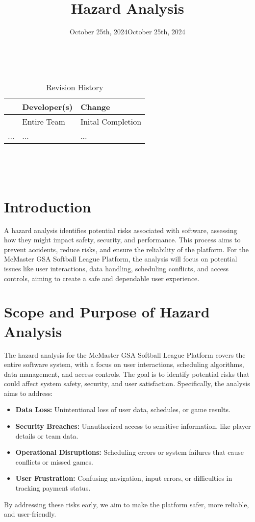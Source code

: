 \documentclass{article}
\title{Hazard Analysis\\\progname}
\author{\authname}
\date{October 25th, 2024}
\begin{document}
\maketitle
\thispagestyle{empty}

~\newpage


\begin{table}[hp]
\caption{Revision History} \label{TblRevisionHistory}
\begin{tabularx}{\textwidth}{llX}
\toprule
\textbf{} & \textbf{Developer(s)} & \textbf{Change}\\
\midrule
\date{October 25th, 2024} & Entire Team & Inital Completion\\
... & ... & ...\\
\bottomrule
\end{tabularx}
\end{table}

~\newpage

\tableofcontents
\listoftables

~\newpage


\section{Introduction}
A hazard analysis identifies potential risks associated with software, assessing how they might impact safety, security, and performance. This process aims to prevent accidents, reduce risks, and ensure the reliability of the platform. For the McMaster GSA Softball League Platform, the analysis will focus on potential issues like user interactions, data handling, scheduling conflicts, and access controls, aiming to create a safe and dependable user experience.

\section{Scope and Purpose of Hazard Analysis}
The hazard analysis for the McMaster GSA Softball League Platform covers the entire software system, with a focus on user interactions, scheduling algorithms, data management, and access controls. The goal is to identify potential risks that could affect system safety, security, and user satisfaction. Specifically, the analysis aims to address:\begin{itemize}
    \item \textbf{Data Loss:} Unintentional loss of user data, schedules, or game results.
    \item \textbf{Security Breaches:} Unauthorized access to sensitive information, like player details or team data.
    \item \textbf{Operational Disruptions:} Scheduling errors or system failures that cause conflicts or missed games.
    \item \textbf{User Frustration:} Confusing navigation, input errors, or difficulties in tracking payment status.
\end{itemize}
By addressing these risks early, we aim to make the platform safer, more reliable, and user-friendly.
\end{document}
